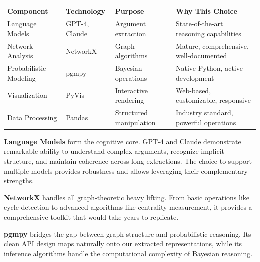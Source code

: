 \documentclass[
  11pt,
  letterpaper,
]{book}
\begin{document}
\begin{longtable}[]{@{}
  >{\raggedright\arraybackslash}p{}
  >{\raggedright\arraybackslash}p{}
  >{\raggedright\arraybackslash}p{}
  >{\raggedright\arraybackslash}p{}@{}}
\toprule\noalign{}
\begin{minipage}[b]{\linewidth}\raggedright
Component
\end{minipage} & \begin{minipage}[b]{\linewidth}\raggedright
Technology
\end{minipage} & \begin{minipage}[b]{\linewidth}\raggedright
Purpose
\end{minipage} & \begin{minipage}[b]{\linewidth}\raggedright
Why This Choice
\end{minipage} \\
\midrule\noalign{}
\endhead
\bottomrule\noalign{}
\endlastfoot
Language Models & GPT-4, Claude & Argument extraction & State-of-the-art
reasoning capabilities \\
Network Analysis & NetworkX & Graph algorithms & Mature, comprehensive,
well-documented \\
Probabilistic Modeling & pgmpy & Bayesian operations & Native Python,
active development \\
Visualization & PyVis & Interactive rendering & Web-based, customizable,
responsive \\
Data Processing & Pandas & Structured manipulation & Industry standard,
powerful operations \\
\end{longtable}

\textbf{Language Models} form the cognitive core. GPT-4 and Claude
demonstrate remarkable ability to understand complex arguments,
recognize implicit structure, and maintain coherence across long
extractions. The choice to support multiple models provides robustness
and allows leveraging their complementary strengths.

\textbf{NetworkX} handles all graph-theoretic heavy lifting. From basic
operations like cycle detection to advanced algorithms like centrality
measurement, it provides a comprehensive toolkit that would take years
to replicate.

\textbf{pgmpy} bridges the gap between graph structure and probabilistic
reasoning. Its clean API design maps naturally onto our extracted
representations, while its inference algorithms handle the computational
complexity of Bayesian reasoning.
\end{document}
